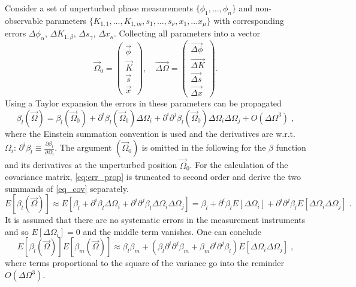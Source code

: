 Consider a set of unperturbed phase measurements $ \{\phi_1, \ldots, \phi_n\} $ and non-observable  parameters $  \{ K_{1,1} , \ldots , K_{1,m}, s_1, \ldots, s_{\nu}, x_1, \ldots x_{\mu} \} $ with corresponding errors $ \Delta \phi_\alpha,\, \Delta K_{1,\beta}, \,\Delta s_\gamma,\, \Delta x_\kappa  $.
Collecting all parameters into a vector
%
\begin{equation}
\vec{\Omega}_0 =
\begin{pmatrix}
\vec{\phi}\\
\vec{K}\\
\vec{s}\\
\vec{x}
\end{pmatrix},\quad
\vec{\Delta \Omega} = 
\begin{pmatrix}
\vec{\Delta\phi}\\
\vec{\Delta K}\\
\vec{\Delta s}\\
\vec{\Delta x}
\end{pmatrix}.
\end{equation}
%
Using a Taylor expansion the errors in these parameters can be propagated
%
\begin{equation}
\beta_l (\vec{\Omega}) = \beta_l(\vec{\Omega}_0) + \partial^i\beta_l(\vec{\Omega}_0)\Delta\Omega_i +  \partial^i\partial^j\beta_l(\vec{\Omega}_0)\Delta\Omega_i\Delta\Omega_j + O(\Delta\Omega^3)\;,
\label{eq:err_prop}
\end{equation}
%
where the Einstein summation convention is used and the derivatives are w.r.t. $ \Omega_i $: $ \partial^i\beta_l \equiv \frac{\partial \beta_l}{\partial \Omega_i} $.
The argument $ (\vec{\Omega}_0) $ is omitted in the following for the $ \beta $ function and its derivatives at the unperturbed position $ \vec{\Omega}_0 $. For the calculation of the covariance matrix,
\eqref{eq:err_prop} is truncated to second order and derive the two summands of \eqref{eq_cov} separately.
%
\begin{equation}
E[\beta_l(\vec{\Omega})] \approx E\left[   
\beta_l + \partial^i\beta_l\Delta\Omega_i +  \partial^i\partial^j\beta_l\Delta\Omega_i\Delta\Omega_j 
\right] =
\beta_l + \partial^i\beta_l E[\Delta\Omega_i] +  \partial^i\partial^j\beta_l E\left[\Delta\Omega_i\Delta\Omega_j \right]\;.
\end{equation}
%
 It is assumed that there are no systematic errors in the measurement instruments and so $ {E}[{\Delta\Omega_i}] =0$ and the middle term vanishes.
One can conclude
%
\begin{equation}
E[\beta_l(\vec{\Omega})]E[\beta_m(\vec{\Omega})] \approx \beta_l\beta_m +
 \left(\beta_l\partial^i\partial^j\beta_m +
 \beta_m\partial^i\partial^j\beta_l\right) E\left[\Delta\Omega_i\Delta\Omega_j \right]\;,
 \label{eq:Eb_Eb}
\end{equation}
%
 where terms proportional to the square of the variance go into the reminder $ O(\Delta\Omega^3) $.

